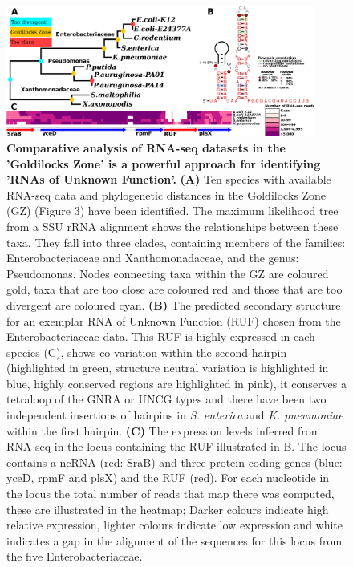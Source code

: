 \documentclass[10pt]{article}
\begin{document}
\begin{figure}[!ht]
\begin{center}
\includegraphics[width=4in]{figures/figure4.pdf}
\end{center}
\caption{ {\bf Comparative analysis of RNA-seq datasets in the
    'Goldilocks Zone' is a powerful approach for identifying 'RNAs of
    Unknown Function'.} {\bf (A)} Ten species with available RNA-seq data
  and phylogenetic distances in the Goldilocks Zone (GZ) (Figure 3)
  have been identified. The maximum likelihood tree from a SSU rRNA
  alignment shows the relationships between these taxa. They fall into
  three clades, containing members of the families: Enterobacteriaceae
  and Xanthomonadaceae, and the genus: Pseudomonas. Nodes connecting
  taxa within the GZ are coloured gold, taxa that are too close are
  coloured red and those that are too divergent are coloured cyan. {\bf (B)}
  The predicted secondary structure for an exemplar RNA of Unknown
  Function (RUF) chosen from the Enterobacteriaceae data. This RUF is
  highly expressed in each species (C), shows co-variation within the
  second hairpin (highlighted in green, structure neutral variation is
  highlighted in blue, highly conserved regions are highlighted in
  pink), it conserves a tetraloop of the GNRA or UNCG types and there
  have been two independent insertions of hairpins in \emph{S. enterica}
  and \emph{K. pneumoniae} within the first hairpin. {\bf (C)} The expression
  levels inferred from RNA-seq in the locus containing the RUF
  illustrated in B. The locus contains a ncRNA (red: SraB) and three
  protein coding genes (blue: yceD, rpmF and plsX) and the RUF
  (red). For each nucleotide in the locus the total number of reads
  that map there was computed, these are illustrated in the heatmap;
  Darker colours indicate high relative expression, lighter colours
  indicate low expression and white indicates a gap in the alignment
  of the sequences for this locus from the five Enterobacteriaceae.}
\label{fig:4}
\end{figure}
\end{document}
